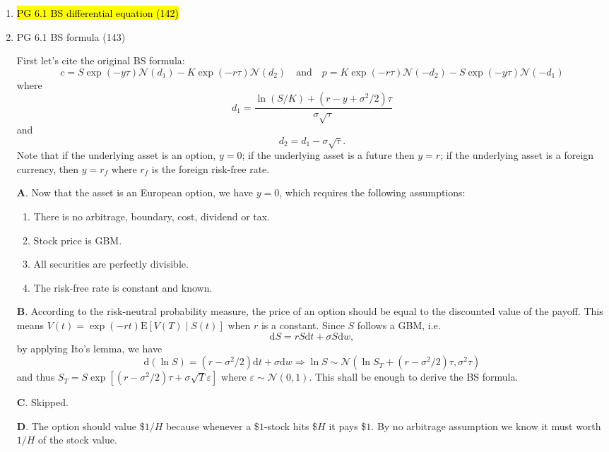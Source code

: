 \documentclass[11pt]{article}
\newcommand{\E}{\text{E}}
\newcommand{\bs}{\boldsymbol}
\renewcommand{\d}{\text{d}}
\renewcommand{\epsilon}{\varepsilon}
\newenvironment{note}{\begin{enumerate}[leftmargin=1em,topsep=0pt,noitemsep]}{\end{enumerate}}
\newenvironment{nnote}{\begin{enumerate}[leftmargin=.95em,topsep=0pt,noitemsep,label=$\bs{\cdot}$]}{\end{enumerate}}
\newcommand{\solution}{\boxed{\textbf{SOLUTION}}\hspace{.5em}}
\begin{document}
\begin{spacing}{1.1}
\begin{note}
\begin{nnote}
      \end{nnote}

\item \hl{PG 6.1 BS differential equation (142)}

\item PG 6.1 BS formula (143)
      
      \solution First let's cite the original BS formula:
      $$
      c = S\exp(-y\tau)\mathcal{N}(d_1) - K\exp(-r\tau)\mathcal{N}(d_2)\quad \text{and}\quad p = K\exp(-r\tau)\mathcal{N}(-d_2) - S\exp(-y\tau)\mathcal{N}(-d_1)
      $$
      where
      $$
      d_1 = \frac{\ln(S/K) + (r-y+\sigma^2/2)\tau}{\sigma\sqrt{\tau}}
      $$
      and
      $$
      d_2 = d_1 - \sigma\sqrt{\tau}.
      $$
      Note that if the underlying asset is an option, $y=0$; if the underlying asset is a future then $y=r$; if the underlying asset is a foreign currency, then $y=r_f$ where $r_f$ is the foreign risk-free rate.

      \textbf{A}. Now that the asset is an European option, we have $y=0$, which requires the following assumptions:
      \begin{nnote}
      \item There is no arbitrage, boundary, cost, dividend or tax.
      \item Stock price is GBM.
      \item All securities are perfectly divisible.
      \item The risk-free rate is constant and known.
      \end{nnote}

      \textbf{B}. According to the risk-neutral probability measure, the price of an option should be equal to the discounted value of the payoff. This means $V(t) = \exp(-rt)\E[V(T)\mid S(t)]$ when $r$ is a constant. Since $S$ follows a GBM, i.e.
      $$
      \d S = rS\d t + \sigma S\d w,
      $$
      by applying Ito's lemma, we have
      $$
      \d (\ln S) = (r - \sigma^2/2)\d t + \sigma\d w\Rightarrow \ln S\sim\mathcal{N}(\ln S_T + (r - \sigma^2/2)\tau, \sigma^2\tau)
      $$
      and thus $S_T = S\exp[(r-\sigma^2/2)\tau + \sigma\sqrt{T}\epsilon]$ where $\epsilon\sim\mathcal{N}(0,1)$. This shall be enough to derive the BS formula. 
      
      \textbf{C}. Skipped.

      \textbf{D}. The option should value \$$1/H$ because whenever a \$$1$-stock hits \$$H$ it pays \$$1$. By no arbitrage assumption we know it must worth $1/H$ of the stock value.      


\end{note}
\end{spacing}
\end{document}
